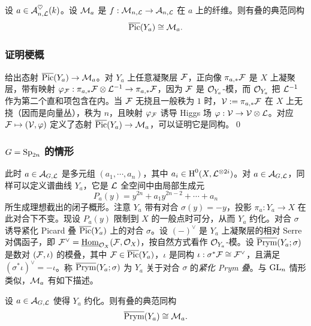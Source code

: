 \begin{prop}\label{p:cPic} 设 $a\in\mathcal{A}^{\heartsuit}_{n,\mathcal{L}}(k)$。设 $\mathcal{M}_{a}$ 是 $f:\mathcal{M}_{n,\mathcal{L}}\to \mathcal{A}_{n,\mathcal{L}}$ 在 $a$ 上的纤维。则有叠的典范同构
\begin{equation*}
\overline{\textup{Pic}}(Y_{a})\cong\mathcal{M}_{a}.
\end{equation*}
\end{prop}

\subsubsection{证明梗概}\label{sss:pf cPic}
给出态射 $\overline{\textup{Pic}}(Y_{a})\to \mathcal{M}_{a}$。对 $Y_{a}$ 上任意凝聚层 $\mathcal{F}$，正向像 $\pi_{a,*}\mathcal{F}$ 是 $X$ 上凝聚层，带有映射 $\varphi_{\mathcal{F}}: \pi_{a,*}\mathcal{F}\otimes\mathcal{L}^{-1}\to\pi_{a,*}\mathcal{F}$，因为 $\mathcal{F}$ 是 $\mathcal{O}_{Y_{a}}$-模，而 $\mathcal{O}_{Y_{a}}$ 把 $\mathcal{L}^{-1}$ 作为第二个直和项包含在内。当 $\mathcal{F}$ 无挠且一般秩为 $1$ 时，$\mathcal{V}:=\pi_{a,*}\mathcal{F}$ 在 $X$ 上无挠（因而是向量丛），秩为 $n$，且映射 $\varphi_{\mathcal{F}}$ 诱导 Higgs 场 $\varphi:\mathcal{V}\to\mathcal{V}\otimes\mathcal{L}$。对应 $\mathcal{F}\mapsto (\mathcal{V},\varphi)$ 定义了态射 $\overline{\textup{Pic}}(Y_{a})\to \mathcal{M}_{a}$，可以证明它是同构。\qed

\subsubsection{$G=\textup{Sp}_{2n}$ 的情形} 此时 $a\in\mathcal{A}_{G,\mathcal{L}}$ 是多元组 $(a_{1},\cdots, a_{n})$，其中 $a_{i}\in\textup{H}^{0}({X,\mathcal{L}^{\otimes2i}})$。对 $a\in\mathcal{A}_{G,\mathcal{L}}$，同样可以定义谱曲线 $Y_{a}$，它是 $\mathcal{L}$ 全空间中由局部生成元
\begin{equation*}
P_{a}(y)=y^{2n}+a_{1}y^{2n-2}+\cdots+a_{n}
\end{equation*}
所生成理想截出的闭子概形。注意 $Y_{a}$ 带有对合 $\sigma(y)=-y$，投影 $\pi_{a}: Y_{a}\to X$ 在此对合下不变。现设 $P_{a}(y)$ 限制到 $X$ 的一般点时可分，从而 $Y_{a}$ 约化。对合 $\sigma$ 诱导紧化 Picard 叠 $\overline{\textup{Pic}}(Y_{a})$ 上的对合 $\sigma$。设 $(-)^{\vee}$ 是 $Y_{a}$ 上凝聚层的相对 Serre 对偶函子，即 $\mathcal{F}^{\vee}=\underline{\textup{Hom}}_{\mathcal{O}_{X}}(\mathcal{F},\mathcal{O}_{X})$，按自然方式看作 $\mathcal{O}_{Y_{a}}$-模。设 $\overline{\textup{Prym}}(Y_{a};\sigma)$ 是数对 $(\mathcal{F},\iota)$ 的模叠，其中 $\mathcal{F}\in\overline{\textup{Pic}}(Y_{a})$，$\iota$ 是同构 $\iota: \sigma^{*}\mathcal{F}\cong\mathcal{F}^{\vee}$，且满足 $(\sigma^{*}\iota)^{\vee}=-\iota$。称 $\overline{\textup{Prym}}(Y_{a};\sigma)$ 为 $Y_{a}$ 关于对合 $\sigma$ 的{\em 紧化 Prym 叠}。与 $\textup{GL}_{n}$ 情形类似，$\mathcal{M}_{a}$ 有如下描述。

\begin{prop} 设 $a\in\mathcal{A}_{G,\mathcal{L}}$ 使得 $Y_{a}$ 约化。则有叠的典范同构
\begin{equation*}
\overline{\textup{Prym}}(Y_{a})\cong\mathcal{M}_{a}.
\end{equation*}
\end{prop}

